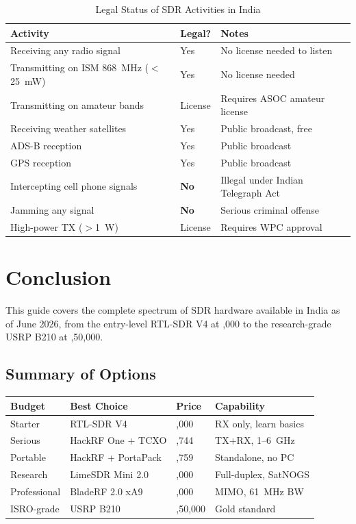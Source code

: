\documentclass[12pt,a4paper]{article}
\begin{document}
\begin{table}[h!]
\centering
\caption{Legal Status of SDR Activities in India}
\begin{tabular}{@{}lll@{}}
\toprule
\textbf{Activity} & \textbf{Legal?} & \textbf{Notes} \\
\midrule
Receiving any radio signal & Yes & No license needed to listen \\
Transmitting on ISM 868~MHz ($<$25~mW) & Yes & No license needed \\
Transmitting on amateur bands & License & Requires ASOC amateur license \\
Receiving weather satellites & Yes & Public broadcast, free \\
ADS-B reception & Yes & Public broadcast \\
GPS reception & Yes & Public broadcast \\
Intercepting cell phone signals & \textbf{No} & Illegal under Indian Telegraph Act \\
Jamming any signal & \textbf{No} & Serious criminal offense \\
High-power TX ($>$1~W) & License & Requires WPC approval \\
\bottomrule
\end{tabular}
\end{table}

\section{Conclusion}

This guide covers the complete spectrum of SDR hardware available in India as of 
June 2026, from the entry-level RTL-SDR V4 at ,000 to the research-grade 
USRP B210 at ,50,000.

\subsection{Summary of Options}

\begin{table}[h!]
\centering
\begin{tabular}{@{}llll@{}}
\toprule
\textbf{Budget} & \textbf{Best Choice} & \textbf{Price} & \textbf{Capability} \\
\midrule
Starter & RTL-SDR V4 & \rupee 6,000 & RX only, learn basics \\
Serious & HackRF One + TCXO & \rupee 25,744 & TX+RX, 1--6~GHz \\
Portable & HackRF + PortaPack & \rupee 60,759 & Standalone, no PC \\
Research & LimeSDR Mini 2.0 & \rupee 40,000 & Full-duplex, SatNOGS \\
Professional & BladeRF 2.0 xA9 & \rupee 75,000 & MIMO, 61~MHz BW \\
ISRO-grade & USRP B210 & \rupee 2,50,000 & Gold standard \\
\bottomrule
\end{tabular}
\end{table}
\end{document}
